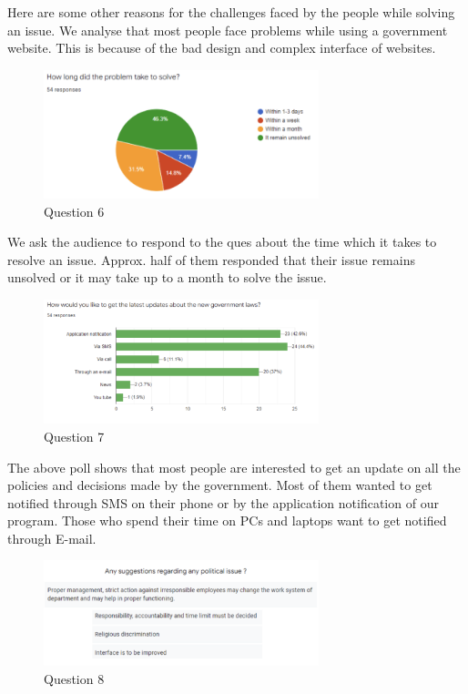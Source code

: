 \documentclass[acmtog]{acmart}
\begin{document}
\begin{description}
    Here are some other reasons for the challenges faced by the people while solving an issue. We analyse that most people face problems while using a government website. This is because of the bad design and complex interface of websites. 

    \begin{figure}[H]
        \includegraphics[width=8cm]{Resources/q6}
        \caption{Question 6}
        \label{fig:q6}
    \end{figure}

    We ask the audience to respond to the ques about the time which it takes to resolve an issue. Approx. half of them responded that their issue remains unsolved or it may take up to a month to solve the issue.

    \begin{figure}[H]
        \includegraphics[width=8cm]{Resources/q7}
        \caption{Question 7}
        \label{fig:q7}
    \end{figure}

    The above poll shows that most people are interested to get an update on all the policies and decisions made by the government. Most of them wanted to get notified through SMS on their phone or by the application notification of our program. Those who spend their time on PCs and laptops want to get notified through E-mail.

    \begin{figure}[H]
        \includegraphics[width=8cm]{Resources/q8}
        \caption{Question 8}
        \label{fig:q8}
    \end{figure}


\end{description}
\end{document}

